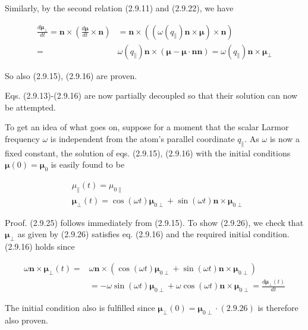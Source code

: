 \documentclass{article}
\begin{document}
Similarly, by the second relation (2.9.11) and (2.9.22), we have
 
\begin{align*}
\frac{d \boldsymbol{\mu}_{\perp}}{d t}=\boldsymbol{n} \times\left(\frac{d \boldsymbol{\mu}}{d t} \times \boldsymbol{n}\right) & =\boldsymbol{n} \times\left(\left(\omega\left(q_{\|}\right) \boldsymbol{n} \times \boldsymbol{\mu}\right) \times \boldsymbol{n}\right)  \tag{2.9.24}\\
= & \omega\left(q_{\|}\right) \boldsymbol{n} \times(\boldsymbol{\mu}-\boldsymbol{\mu} \cdot \boldsymbol{n} \boldsymbol{n})=\omega\left(q_{\|}\right) \boldsymbol{n} \times \boldsymbol{\mu}_{\perp}
\end{align*}
 

So also (2.9.15), (2.9.16) are proven.

Eqs. (2.9.13)-(2.9.16) are now partially decoupled so that their solution can now be attempted.

To get an idea of what goes on, suppose for a moment that the scalar Larmor frequency $\omega$ is independent from the atom's parallel coordinate $q_{\|}$. As $\omega$ is now a fixed constant, the solution of eqs. (2.9.15), (2.9.16) with the initial conditions $\boldsymbol{\mu}(0)=\boldsymbol{\mu}_{0}$ is easily found to be
 
\begin{align*}
& \mu_{\|}(t)=\mu_{0 \|}  \tag{2.9.25}\\
& \boldsymbol{\mu}_{\perp}(t)=\cos (\omega t) \boldsymbol{\mu}_{0 \perp}+\sin (\omega t) \boldsymbol{n} \times \boldsymbol{\mu}_{0 \perp} \tag{2.9.26}
\end{align*}
 

Proof. (2.9.25) follows immediately from (2.9.15).
To show (2.9.26), we check that $\boldsymbol{\mu}_{\perp}$ as given by (2.9.26) satisfies eq. (2.9.16) and the required initial condition. (2.9.16) holds since
 
\begin{align*}
\omega \boldsymbol{n} \times \boldsymbol{\mu}_{\perp}(t)= & \omega \boldsymbol{n} \times\left(\cos (\omega t) \boldsymbol{\mu}_{0 \perp}+\sin (\omega t) \boldsymbol{n} \times \boldsymbol{\mu}_{0 \perp}\right)  \tag{2.9.27}\\
& =-\omega \sin (\omega t) \boldsymbol{\mu}_{0 \perp}+\omega \cos (\omega t) \boldsymbol{n} \times \boldsymbol{\mu}_{0 \perp}=\frac{d \boldsymbol{\mu}_{\perp}(t)}{d t}
\end{align*}
 

The initial condition also is fulfilled since $\boldsymbol{\mu}_{\perp}(0)=\boldsymbol{\mu}_{0 \perp} \cdot(2.9 .26)$ is therefore also proven.
\end{document}

